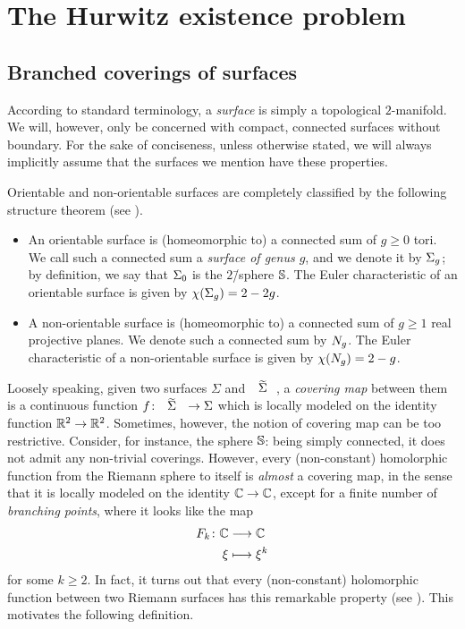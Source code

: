
\chapter{The Hurwitz existence problem}
\largevertices

\section{Branched coverings of surfaces}

According to standard terminology, a \emph{surface} is simply a topological $2$-manifold. We will, however, only be concerned with compact, connected surfaces without boundary. For the sake of conciseness, unless otherwise stated, we will always implicitly assume that the surfaces we mention have these properties.

Orientable and non-orientable surfaces are completely classified by the following structure theorem (see ).
\begin{itemize}
\item An orientable surface is (homeomorphic to) a connected sum of $g\ge 0$ tori. We call such a connected sum a \emph{surface of genus $g$}, and we denote it by $\Sigma_{g}$; by definition, we say that $\Sigma_{0}$ is the $2$\=/sphere $\mathbb{S}{}$. The Euler characteristic of an orientable surface is given by $\chi(\Sigma_{g})=2-2g$.
\item A non-orientable surface is (homeomorphic to) a connected sum of $g\ge 1$ real projective planes. We denote such a connected sum by $N_{g}$. The Euler characteristic of a non-orientable surface is given by $\chi(N_{g})=2-g$.
\end{itemize}


Loosely speaking, given two surfaces $\Sigma$ and $\tSigma$, a \emph{covering map} between them is a continuous function $\map{f}{\tSigma}{\Sigma}$ which is locally modeled on the identity function $\umap{\RR^2}{\RR^2}$. Sometimes, however, the notion of covering map can be too restrictive. Consider, for instance, the sphere $\mathbb{S}{}$: being simply connected, it does not admit any non-trivial coverings. However, every (non-constant) homolorphic function from the Riemann sphere to itself is \emph{almost} a covering map, in the sense that it is locally modeled on the identity $\umap{\CC}{\CC}$, except for a finite number of \emph{branching points}, where it looks like the map
\[
\begin{alignedat}{2} F_k\colon&&\mathbb{C}&\longrightarrow\mathbb{C}\\ &&\xi&\longmapsto\xi^k \end{alignedat}
\]
for some $k\ge 2$. In fact, it turns out that every (non-constant) holomorphic function between two Riemann surfaces has this remarkable property (see ). This motivates the following definition.

